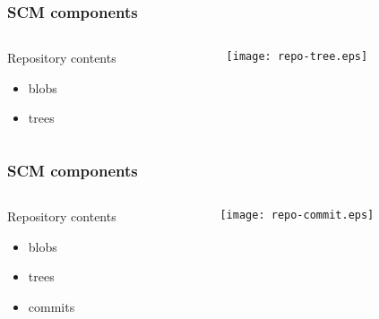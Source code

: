 \documentclass[english]{beamer}
\begin{document}
\begin{frame}
\frametitle{SCM components}
\begin{columns}[t]
        \begin{column}{.5\textwidth}
                Repository contents
                \begin{itemize}
                        \item blobs
                        \item trees
                \end{itemize}
        \end{column}
        \begin{column}[T]{.5\textwidth}
                \vspace{.2\textheight}
                \texttt{[image: repo-tree.eps]}
        \end{column}
\end{columns}

\end{frame}

\begin{frame}
\frametitle{SCM components}
\begin{columns}[t]
        \begin{column}{.5\textwidth}
                Repository contents
                \begin{itemize}
                        \item blobs
                        \item trees
                        \item commits
                \end{itemize}
        \end{column}
        \begin{column}[T]{.5\textwidth}
                \vspace{.2\textheight}
                \texttt{[image: repo-commit.eps]}
        \end{column}
\end{columns}

\end{frame}
\end{document}
